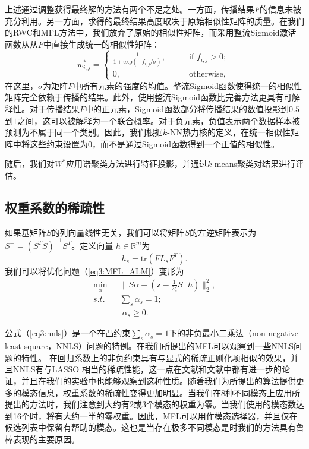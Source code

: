 上述通过调整获得最终解的方法有两个不足之处。一方面，传播结果$ {F} $的信息未被充分利用。另一方面，求得的最终结果高度取决于原始相似性矩阵的质量。在我们的RWC和MFL方法中，我们放弃了原始的相似性矩阵，而采用整流Sigmoid激活函数从从$F$中直接生成统一的相似性矩阵：
\begin{equation}
w^*_{i,j} = 
\begin{cases}
\frac{1}{1+\text{exp}(-f_{i,j}/\sigma)}, \qquad &\text{if }f_{i,j}>0;\\
0, &\text{otherwise, }
\end{cases}
\label{eq3:rSa}
\end{equation}
在这里，$ \sigma  $为矩阵$F$中所有元素的强度的均值。整流Sigmoid函数使得统一的相似性矩阵完全依赖于传播的结果。此外，使用整流Sigmoid函数比完善方法更具有可解释性。对于传播结果$F$中的正元素，Sigmoid函数部分将传播结果的数值投影到$0.5$到$1$之间，这可以被解释为一个联合概率。对于负元素，负值表示两个数据样本被预测为不属于同一个类别。因此，我们根据$k$-NN热力核的定义，在统一相似性矩阵中将这些约束设置为$0$，而不是通过Sigmoid函数得到一个正值的相似性。

随后，我们对$ W^* $应用谱聚类方法\cite{von2007tutorial}进行特征投影，并通过$ k$-means聚类对结果进行评估。

\subsection{权重系数的稀疏性}
\label{sec3:dis}
如果基矩阵$S$的列向量线性无关，我们可以将矩阵$S$的左逆矩阵表示为$ {S} ^+ = ({S}^T{S})^{-1}{S}^T$。定义向量 $ {h} \in  \mathbb{R}^{m} $为
\begin{equation}
h_s = \text{tr}({F} \bar{{L}}_s{F}^T).
\end{equation}
我们可以将优化问题（\ref{eq3:MFL_ALM}）变形为
\begin{equation}
\begin{split}
\mathop{\mathrm{min}}_{{\alpha}}\;&\|{S}{\alpha} - ( \mathbf{z} - \frac{1}{2\zeta}{S}^+ {h}) \|_2^2,\\
s.t.\quad& \sum_s \alpha_s = 1;\\ &\; \alpha_s \ge 0.
\label{eq3:nnls}
\end{split}
\end{equation}

公式（\ref{eq3:nnls}）是一个在凸约束$ \sum_s \alpha_s = 1 $下的非负最小二乘法（non-negative least square，NNLS）问题的特例。在我们所提出的MFL可以观察到一些NNLS问题的特性。
在回归系数上的非负约束具有与显式的稀疏正则化项相似的效果，并且NNLS有与LASSO \cite{tibshirani1996regression}相当的稀疏性能，这一点在文献\parencite{slawski2011sparse}和文献\parencite{slawski2013non}中都有进一步的论证，并且在我们的实验中也能够观察到这种性质。随着我们为所提出的算法提供更多的模态信息，权重系数的稀疏性变得更加明显。当我们在8种不同模态上应用所提出的方法时，我们注意到大约有2或3个模态的权重为零。当我们使用的模态数达到16个时，将有大约一半的零权重。因此，MFL可以用作模态选择器，并且仅在候选列表中保留有帮助的模态。这也是当存在极多不同模态是时我们的方法具有鲁棒表现的主要原因。


